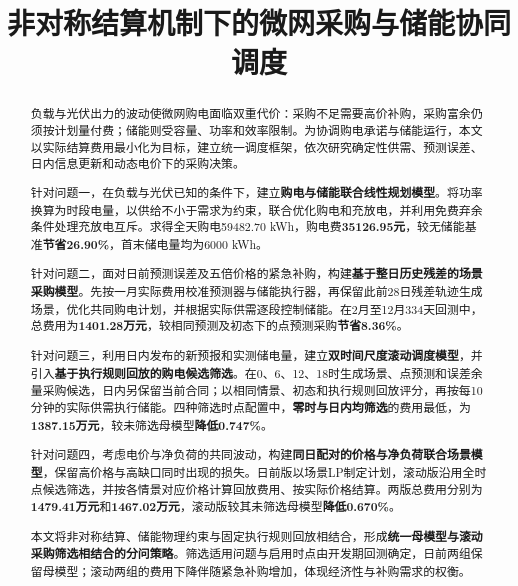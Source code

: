 \documentclass[withoutpreface,bwprint]{cumcmthesis}
\title{非对称结算机制下的微网采购与储能协同调度}
\renewcommand{\thesection}{\chinese{section}、}
\begin{document}
\maketitle
\begin{abstract}
\setlength{\parskip}{0.45em}
负载与光伏出力的波动使微网购电面临双重代价：采购不足需要高价补购，采购富余仍须按计划量付费；储能则受容量、功率和效率限制。为协调购电承诺与储能运行，本文以实际结算费用最小化为目标，建立统一调度框架，依次研究确定性供需、预测误差、日内信息更新和动态电价下的采购决策。

针对问题一，在负载与光伏已知的条件下，建立\textbf{\heiti 购电与储能联合线性规划模型}。将功率换算为时段电量，以供给不小于需求为约束，联合优化购电和充放电，并利用免费弃余条件处理充放电互斥。求得全天购电59482.70 kWh，购电费\textbf{35126.95元}，较无储能基准\textbf{节省26.90\%}，首末储电量均为6000 kWh。

针对问题二，面对日前预测误差及五倍价格的紧急补购，构建\textbf{\heiti 基于整日历史残差的场景采购模型}。先按一月实际费用校准预测器与储能执行器，再保留此前28日残差轨迹生成场景，优化共同购电计划，并根据实际供需逐段控制储能。在2月至12月334天回测中，总费用为\textbf{1401.28万元}，较相同预测及初态下的点预测采购\textbf{节省8.36\%}。

针对问题三，利用日内发布的新预报和实测储电量，建立\textbf{\heiti 双时间尺度滚动调度模型}，并引入\textbf{\heiti 基于执行规则回放的购电候选筛选}。在0、6、12、18时生成场景、点预测和误差余量采购候选，日内另保留当前合同；以相同情景、初态和执行规则回放评分，再按每10分钟的实际供需执行储能。四种筛选时点配置中，\textbf{\heiti 零时与日内均筛选}的费用最低，为\textbf{1387.15万元}，较未筛选母模型\textbf{降低0.747\%}。

针对问题四，考虑电价与净负荷的共同波动，构建\textbf{\heiti 同日配对的价格与净负荷联合场景模型}，保留高价格与高缺口同时出现的损失。日前版以场景LP制定计划，滚动版沿用全时点候选筛选，并按各情景对应价格计算回放费用、按实际价格结算。两版总费用分别为\textbf{1479.41万元}和\textbf{1467.02万元}，滚动版较其未筛选母模型\textbf{降低0.670\%}。

本文将非对称结算、储能物理约束与固定执行规则回放相结合，形成\textbf{\heiti 统一母模型与滚动采购筛选相结合的分问策略}。筛选适用问题与启用时点由开发期回测确定，日前两组保留母模型；滚动两组的费用下降伴随紧急补购增加，体现经济性与补购需求的权衡。

\end{abstract}


\FloatBarrier

\FloatBarrier

\FloatBarrier

\FloatBarrier

\FloatBarrier


\FloatBarrier
{}


\clearpage
\begin{appendices}
\renewcommand{\thesection}{\appendixname\Alph{section}}

\end{appendices}
\end{document}
